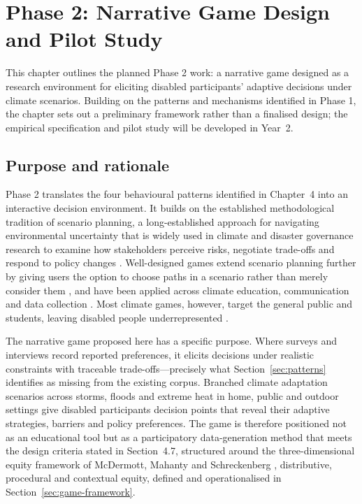 \documentclass[12pt,a4paper]{report}
\begin{document}

\clearpage
\chapter{Phase 2: Narrative Game Design and Pilot Study}
\vspace*{-1cm}

This chapter outlines the planned Phase 2 work: a narrative game designed as a research environment for eliciting disabled participants' adaptive decisions under climate scenarios. Building on the patterns and mechanisms identified in Phase 1, the chapter sets out a preliminary framework rather than a finalised design; the empirical specification and pilot study will be developed in Year~2.
\clearpage

\section{Purpose and rationale}

Phase 2 translates the four behavioural patterns identified in Chapter~4 into an interactive decision environment. It builds on the established methodological tradition of scenario planning, a long-established approach for navigating environmental uncertainty \cite{wack1985scenarios,bowman2013storytelling} that is widely used in climate and disaster governance research to examine how stakeholders perceive risks, negotiate trade-offs and respond to policy changes \cite{TannenbaumBaruchi2024}. Well-designed games extend scenario planning further by giving users the option to choose paths in a scenario rather than merely consider them \cite{somerdin2016game}, and have been applied across climate education, communication and data collection \cite{gerber2021games,mcgonigal2011reality,ulrich2014gaming}. Most climate games, however, target the general public and students, leaving disabled people underrepresented \cite{o2010values}.

The narrative game proposed here has a specific purpose. Where surveys and interviews record reported preferences, it elicits decisions under realistic constraints with traceable trade-offs---precisely what Section~\ref{sec:patterns} identifies as missing from the existing corpus. Branched climate adaptation scenarios across storms, floods and extreme heat in home, public and outdoor settings give disabled participants decision points that reveal their adaptive strategies, barriers and policy preferences. The game is therefore positioned not as an educational tool but as a participatory data-generation method that meets the design criteria stated in Section~4.7, structured around the three-dimensional equity framework of McDermott, Mahanty and Schreckenberg \cite{mcdermott2013examining}, distributive, procedural and contextual equity, defined and operationalised in Section~\ref{sec:game-framework}.
\end{document}

